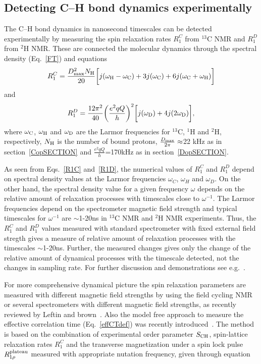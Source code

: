 \documentclass[aps,prl,superscriptaddress,twocolumn]{revtex4}
\begin{document}
\subsection{Detecting C--H bond dynamics experimentally}\label{dynamicsEXP}

The C--H bond dynamics in nanosecond timescales can be detected experimentally by measuring
the spin relaxation rates $R_1^C$ from $^{13}$C NMR and $R_1^D$ from $^2$H NMR. 
These are connected the molecular dynamics through the spectral density (Eq.~\ref{FT}) and equations \cite{harris86}
\begin{equation}\label{R1C}
R_{1}^{C}=\frac{D_{\rm{max}}^2N_{\rm{H}}}{20}\bigg[j(\omega_{\rm{H}}-\omega_{\rm{C}})+3j(\omega_{\rm{C}})+6j(\omega_{\rm{C}}+\omega_{\rm{H}})\bigg]
\end{equation}
and
\begin{equation}\label{R1D}
R_{1}^{D}=\frac{12\pi^2}{40}\bigg(\frac{e^2qQ}{h}\bigg)^2\bigg[j(\omega_{\rm{D}})+4j(2\omega_{\rm{D}})\bigg],
\end{equation}
where $\omega_{\rm{C}}$, $\omega_{\rm{H}}$ and $\omega_{\rm{D}}$ are the Larmor frequencies for $^{13}$C, $^1$H and $^2$H, respectively, 
$N_{\rm{H}}$ is the number of bound protons, $\frac{D_{\rm{max}}}{2\pi}\approx$22 kHz as in section~\ref{CopSECTION} and
$\frac{e^2qQ}{h}$=170kHz as in section~\ref{DopSECTION}.

As seen from Eqs.~\ref{R1C} and~\ref{R1D}, the numerical values of $R_1^{C}$ and $R_1^{D}$ depend on 
spectral density values at the Larmor frequencies $\omega_C$, $\omega_H$ and $\omega_D$.
On the other hand, the spectral density value for a given frequency $\omega$ 
depends on the relative amount of relaxation processes with timescales close to $\omega^{-1}$.
The Larmor frequencies depend on the spectrometer magnetic field strength and typical
timescales for $\omega^{-1}$ are $\sim$1-20ns in $^{13}$C NMR and $^2$H NMR experiments.
Thus, the $R_1^{C}$ and $R_1^{D}$ values measured with standard spectrometer with fixed external
field stregth gives a measure of relative amount of relaxation processes with the timescales $\sim$1-20ns.
Further, the measured changes gives only the change of the relative amount of dynamical processes with
the timescale detected, not the changes in sampling rate. For further discussion and demonstrations see e.g.~\cite{ferreira15}.

For more comprehensive dynamical picture the spin relaxation parameters are 
measured with different magnetic field strengths by using the field cycling NMR~\cite{roberts04a,roberts04b,roberts09,sivanandam09}
or several spectrometers with different magnetic field strengths, as recently reviewed by Leftin and brown~\cite{leftin11}.
Also the model free approach to measure the effective correlation time (Eq.~\ref{effCTdef}) was recently
introduced~\cite{ferreira15}. The method is based on the combination of experimental order parameter $S_{{\rm CH}}$,
spin-lattice relaxation rates $R_1^C$ and the transverse magnetization under a spin lock pulse $R_{1\rho}^{\rm{plateau}}$ 
measured with appropriate nutation frequency, given through equation
\end{document}
